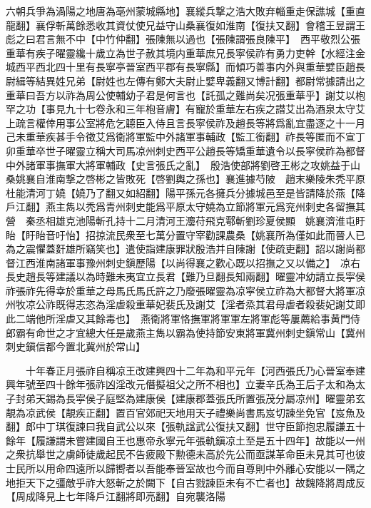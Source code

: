 六朝兵爭為渦陽之地唐為亳州蒙城縣地】襄縱兵撃之浩大敗弃輜重走保譙城【重直龍翻】襄俘斬萬餘悉收其資仗使兄益守山桑襄復如淮南【復扶又翻】會稽王昱謂王彪之曰君言無不中【中竹仲翻】張陳無以過也【張陳謂張良陳平】　西平敬烈公張重華有疾子曜靈纔十歲立為世子赦其境内重華庶兄長寜侯祚有勇力吏幹【水經注金城西平西北四十里有長寧亭晉室西平郡有長寧縣】而傾巧善事内外與重華嬖臣趙長尉緝等結異姓兄弟【尉姓也左傳有鄭大夫尉止嬖卑義翻又博計翻】都尉常據請出之重華曰吾方以祚為周公使輔幼子君是何言也【託孤之難尚矣况張重華乎】謝艾以枹罕之功【事見九十七卷永和三年枹音膚】有寵於重華左右疾之譛艾出為酒泉太守艾上疏言權倖用事公室將危乞聼臣入侍且言長寜侯祚及趙長等將爲亂宜盡逐之十一月己未重華疾甚手令徵艾爲衛將軍監中外諸軍事輔政【監工銜翻】祚長等匿而不宣丁卯重華卒世子曜靈立稱大司馬凉州刺史西平公趙長等矯重華遺令以長寜侯祚為都督中外諸軍事撫軍大將軍輔政【史言張氏之亂】　殷浩使部將劉啓王彬之攻姚益于山桑姚襄自淮南撃之啓彬之皆敗死【啓劉輿之孫也】襄進據芍陂　趙末樂陵朱秃平原杜能清河丁嬈【嬈乃了翻又如紹翻】陽平孫元各擁兵分據城邑至是皆請降於燕【降戶江翻】燕主雋以秃爲青州刺史能爲平原太守嬈為立節將軍元爲兖州刺史各留撫其營　秦丞相雄克池陽斬孔持十二月清河王灋苻飛克鄠斬劉珍夏侯顯　姚襄濟淮屯盱眙【盱眙音吁怡】招掠流民衆至七萬分置守宰勸課農桑【姚襄所為僅如此而晉人已為之震懼蓋姧雄所竊笑也】遣使詣建康罪狀殷浩并自陳謝【使疏吏翻】詔以謝尚都督江西淮南諸軍事豫州刺史鎭歷陽【以尚得襄之歡心既以招撫之又以備之】　凉右長史趙長等建議以為時難未夷宜立長君【難乃旦翻長知兩翻】曜靈冲幼請立長寜侯祚張祚先得幸於重華之母馬氏馬氏許之乃廢張曜靈為凉寜侯立祚為大都督大將軍凉州牧凉公祚既得志恣為淫虐殺重華妃裴氏及謝艾【淫者烝其君母虐者殺裴妃謝艾即此二端他所淫虐又其餘毒也】　燕衛將軍恪撫軍將軍軍左將軍彪等屢薦給事黄門侍郎霸有命世之才宜總大任是歲燕主雋以霸為使持節安東將軍冀州刺史鎭常山【冀州刺史鎭信都今置北冀州於常山】

　　十年春正月張祚自稱凉王改建興四十二年為和平元年【河西張氏乃心晉室奉建興年號至四十餘年張祚凶淫改元僭擬祖父之所不相也】立妻辛氏為王后子太和為太子封弟天錫為長寜侯子庭堅為建康侯【建康郡蓋張氏所置張茂分屬凉州】曜靈弟玄靚為凉武侯【靚疾正翻】置百官郊祀天地用天子禮樂尚書馬岌切諫坐免官【岌魚及翻】郎中丁琪復諫曰我自武公以來【張軌諡武公復扶又翻】世守臣節抱忠履謙五十餘年【履謙謂未嘗建國自王也惠帝永寧元年張軌鎭凉土至是五十四年】故能以一州之衆抗舉世之虜師徒歲起民不告疲殿下勲德未高於先公而亟謀革命臣未見其可也彼士民所以用命四遠所以歸嚮者以吾能奉晉室故也今而自尊則中外離心安能以一隅之地拒天下之彊敵乎祚大怒斬之於闕下【自古戮諫臣未有不亡者也】故魏降將周成反【周成降見上七年降戶江翻將即亮翻】自宛襲洛陽

